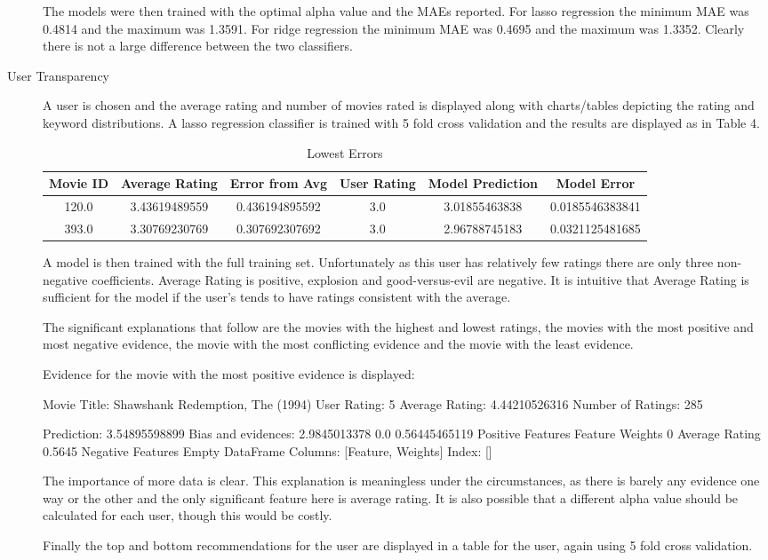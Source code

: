 \documentclass[letterpaper, 10 pt, conference]{ieeeconf}  %
\begin{document}
\begin{description}
The models were then trained with the optimal alpha value and the MAEs reported. For lasso regression the minimum MAE was 0.4814 and the maximum was 1.3591. For ridge regression the minimum MAE was 0.4695 and the maximum was 1.3352. Clearly there is not a large difference between the two classifiers.
\item[User Transparency]
A user is chosen and the average rating and number of movies rated is displayed along with charts/tables depicting the rating and keyword distributions.
A lasso regression classifier is trained with 5 fold cross validation and the results are displayed as in Table 4.

\begin{table*}[t]
\caption{Lowest Errors}
\centering
\label{table_example}
\begin{center}
\begin{tabular}{c c c c c c}
\hline
Movie ID & Average Rating & Error from Avg & User Rating & Model Prediction & Model Error\\
\hline
120.0 & 3.43619489559 & 0.436194895592 & 3.0    & 3.01855463838 & 0.0185546383841\\
393.0 & 3.30769230769 & 0.307692307692 & 3.0 & 2.96788745183 & 0.0321125481685\\
\hline
\end{tabular}
\end{center}
\end{table*}

A model is then trained with the full training set. Unfortunately as this user has relatively few ratings there are only three non-negative coefficients. Average Rating is positive, explosion and good-versus-evil are negative. It is intuitive that Average Rating is sufficient for the model if the user's tends to have ratings consistent with the average. 

The significant explanations that follow are the movies with the highest and lowest ratings, the movies with the most positive and most negative evidence, the movie with the most conflicting evidence and the movie with the least evidence. 

Evidence for the movie with the most positive evidence is displayed:

Movie Title:  Shawshank Redemption, The (1994)
User Rating:  5
Average Rating:  4.44210526316
Number of Ratings:  285


Prediction:  3.54895598899
Bias and evidences: 2.9845013378 0.0 0.56445465119
Positive Features
          Feature  Weights
0  Average Rating   0.5645
Negative Features
Empty DataFrame
Columns: [Feature, Weights]
Index: []

The importance of more data is clear. This explanation is meaningless under the circumstances, as there is barely any evidence one way or the other and the only significant feature here is average rating. It is also possible that a different alpha value should be calculated for each user, though this would be costly.

Finally the top and bottom recommendations for the user are displayed in a table for the user, again using 5 fold cross validation.

\end{description}
\end{document}
